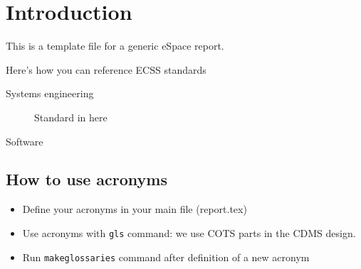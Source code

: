 \section{Introduction}

This is a template file for a generic eSpace report. 

Here's how you can reference ECSS standards

\begin{description}
\item[Systems engineering] Standard in here \cite{ECSS-E-ST-10C}
\item[Software] \cite{ECSS-E-ST-70-01C, ECSS-E-ST-70-32C} \cite{ECSS-E-ST-40C}
\end{description}

\subsection{How to use acronyms} 

\begin{itemize}
\item Define your acronyms in your main file (report.tex) 
\item Use acronyms with \texttt{gls} command: we use \gls{COTS} parts
  in the \gls{CDMS} design. 
\item Run \texttt{makeglossaries} command after definition of a new acronym 
\end{itemize}

